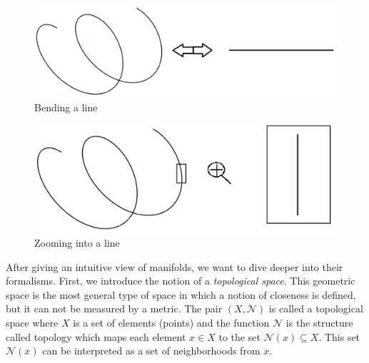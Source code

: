 \begin{figure}[!]
	\centering
	\includegraphics[width=\columnwidth]{images/homeomorphism_line.jpg}
	\caption[Bending a line]{Bending a line}
    \label{fig:homeomorphism_line}
\end{figure}
\begin{figure}[!]
	\centering
	\includegraphics[width=\columnwidth]{images/zoom_in.jpg}
	\caption[Zooming into a line]{Zooming into a line}
    \label{fig:zoom_in}
\end{figure}

After giving an intuitive view of manifolds, we want to dive deeper into their formalisms. First, we introduce the notion of a \textit{topological space}. This geometric space is the most general type of space in which a notion of closeness is defined, but it can not be measured by a metric. The pair $(X, \mathcal{N})$ is called a topological space where $X$ is a set of elements (points) and the function $\mathcal{N}$ is the structure called topology which maps each element $x \in X$  to the set $\mathcal{N}(x) \subseteq X$. This set $\mathcal{N}(x)$ can be interpreted as a set of neighborhoods from $x$. \cite{wiki_topological_space}

